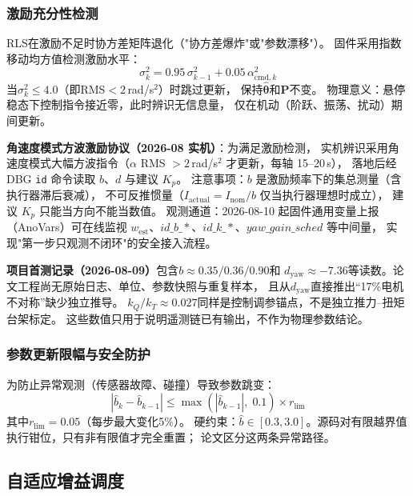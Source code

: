 \subsubsection{激励充分性检测}

RLS在激励不足时协方差矩阵退化（"协方差爆炸"或"参数漂移"）。
固件采用指数移动均方值检测激励水平：
\begin{equation}
    \sigma_k^2 = 0.95\,\sigma_{k-1}^2 + 0.05\,\alpha_{\mathrm{cmd},k}^2
    \label{eq:excitation}
\end{equation}
当$\sigma_k^2\leq4.0$（即RMS$<2$\,rad/s$^2$）时跳过更新，
保持$\hat{\boldsymbol{\theta}}$和$\mathbf{P}$不变。
物理意义：悬停稳态下控制指令接近零，此时辨识无信息量，
仅在机动（阶跃、振荡、扰动）期间更新。

\textbf{角速度模式方波激励协议（2026-08 实机）}：为满足激励检测，
实机辨识采用角速度模式大幅方波指令（$\alpha$ RMS $>2$\,rad/s$^2$ 才更新，每轴 15--20\,s），
落地后经 DBG \texttt{id} 命令读取 $b$、$d$ 与建议 $K_p$。
注意事项：$b$ 是激励频率下的集总测量（含执行器滞后衰减），
不可反推惯量（$I_{\text{actual}}=I_{\text{nom}}/b$ 仅当执行器理想时成立），
建议 $K_p$ 只能当方向不能当数值。
观测通道：2026-08-10 起固件通用变量上报（AnoVars）可在线监视
$w_{\text{est}}$、$id\_b\_*$、$id\_k\_*$、$yaw\_gain\_sched$ 等中间量，
实现"第一步只观测不闭环"的安全接入流程。

\textbf{项目首测记录（2026-08-09）}包含$b\approx0.35/0.36/0.90$和
$d_{\mathrm{yaw}}\approx-7.36$等读数。论文工程尚无原始日志、单位、参数快照与重复样本，
且从$d_{\mathrm{yaw}}$直接推出“17\%电机不对称”缺少独立推导。
$k_Q/k_T\approx0.027$同样是控制调参锚点，不是独立推力--扭矩台架标定。
这些数值只用于说明遥测链已有输出，不作为物理参数结论。

\subsubsection{参数更新限幅与安全防护}

为防止异常观测（传感器故障、碰撞）导致参数跳变：
\begin{equation}
    |\hat{b}_k - \hat{b}_{k-1}|
    \leq \max(|\hat{b}_{k-1}|,\;0.1)\times r_{\lim}
    \label{eq:rate_limit}
\end{equation}
其中$r_{\lim}=0.05$（每步最大变化5\%）。
硬约束：$\hat b\in[0.3,3.0]$。源码对有限越界值执行钳位，只有非有限值才完全重置；
论文区分这两条异常路径。

\subsection{自适应增益调度}
\label{sec:adaptive_scheduling}

